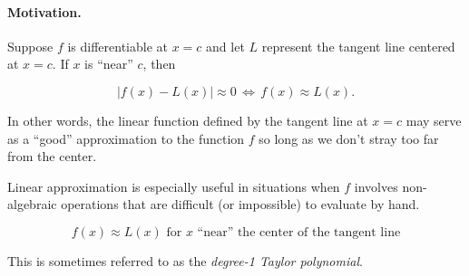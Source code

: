 \documentclass[12pt]{article}
\begin{document}
\paragraph{Motivation.} Suppose $f$ is differentiable at $x=c$ and let $L$ represent the tangent line centered at $x=c$. If $x$ is ``near'' $c$, then

$$\big| f(x)-L(x)\big| \approx 0 \, \Longleftrightarrow \, f(x)\approx L(x).$$

\vspace{3mm}

In other words, the linear function defined by the tangent line at $x=c$ may serve as a ``good'' approximation to the function $f$ so long as we don't stray too far from the center. 

\vspace{3mm}

Linear approximation is especially useful in situations when $f$ involves non-algebraic operations that are difficult (or impossible) to evaluate by hand.

\begin{center}
		$$ f(x) \approx L(x) \text{ for } x \text{ ``near'' the center of the tangent line}$$
        \end{center}
        
        \vspace{5mm}
        

\vspace{5mm}

This is sometimes referred to as the \textit{degree-1 Taylor polynomial}.
\end{document}
